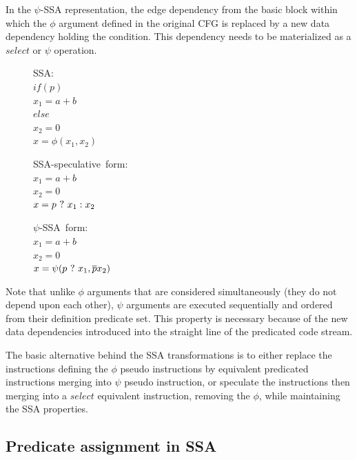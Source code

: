 In the $\psi$-SSA representation, the edge dependency from the basic block within which the $\phi$ argument defined in the original CFG is replaced by a new data dependency holding the condition. This dependency needs to be materialized as a $select$ or $\psi$ operation.

\begin{figure}
\begin{minipage}[t]{3.5cm}
\mbox{SSA:} \\
$ if (p) $ \\
$   x_1 = a+b $ \\
$ else $ \\
$   x_2 = 0 $ \\
$ x = \phi (x_1, x_2) $ \\
\end{minipage}
\begin{minipage}[t]{3.5cm}
\mbox{SSA-speculative form:} \\
$x_1 = a + b $ \\
$x_2 = 0 $ \\
$x = p ~?~  x_1 : x_2$ \\
\end{minipage}
\begin{minipage}[t]{3.5cm}
\mbox{$\psi$-SSA form:} \\
$x_1 = a + b $ \\
$x_2 = 0 $\\
$x = \psi (p ~?~ x_1, \overline{p} x_2) $ \\
\end{minipage}
\end{figure}

Note that unlike $\phi$ arguments that are considered simultaneously (they do not depend upon each other), $\psi$ arguments are executed sequentially and ordered from their definition predicate set. This property is necessary because of the new data dependencies introduced into the straight line of the predicated code stream.

The basic alternative behind the SSA transformations is to either replace the instructions defining the $\phi$ pseudo instructions by equivalent predicated instructions merging into $\psi$ pseudo instruction, or speculate the instructions then merging into a $select$ equivalent instruction, removing the $\phi$, while maintaining the SSA properties.

\subsection{Predicate assignment in SSA}

